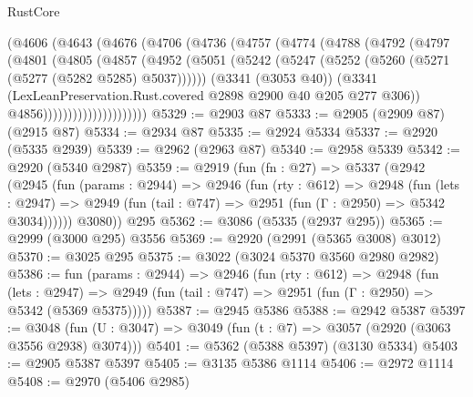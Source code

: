 \begin{lexlean}{RustCore}
\begin{coremodule}
                (@4606
                  (@4643
                    (@4676
                      (@4706
                        (@4736
                          (@4757
                            (@4774
                              (@4788
                                (@4792
                                  (@4797
                                    (@4801
                                      (@4805
                                        (@4857
                                          (@4952
                                            (@5051
                                              (@5242
                                                (@5247
                                                  (@5252
                                                    (@5260 (@5271 (@5277 (@5282 @5285) @5037))))))
                                              (@3341 (@3053 @40))
                                              (@3341
                                                (LexLeanPreservation.Rust.covered
                                                  @2898
                                                  @2900
                                                  @40
                                                  @205
                                                  @277
                                                  @306))
                                              @4856)))))))))))))))))))))
@5329 := @2903 @87
@5333 := @2905 (@2909 @87) (@2915 @87)
@5334 := @2934 @87
@5335 := @2924 @5334
@5337 := @2920 (@5335 @2939)
@5339 := @2962 (@2963 @87)
@5340 := @2958 @5339
@5342 := @2920 (@5340 @2987)
@5359 := @2919
    (fun (fn : @27) =>
    @5337
      (@2942
        (@2945
          (fun (params : @2944) =>
          @2946
            (fun (rty : @612) =>
            @2948
              (fun (lets : @2947) =>
              @2949 (fun (tail : @747) => @2951 (fun (Γ : @2950) => @5342 @3034))))))
        @3080))
    @295
@5362 := @3086 (@5335 (@2937 @295))
@5365 := @2999 (@3000 @295) @3556
@5369 := @2920 (@2991 (@5365 @3008) @3012)
@5370 := @3025 @295
@5375 := @3022 (@3024 @5370 @3560 @2980 @2982)
@5386 := fun (params : @2944) =>
  @2946
    (fun (rty : @612) =>
    @2948
      (fun (lets : @2947) =>
      @2949 (fun (tail : @747) => @2951 (fun (Γ : @2950) => @5342 (@5369 @5375)))))
@5387 := @2945 @5386
@5388 := @2942 @5387
@5397 := @3048 (fun (U : @3047) => @3049 (fun (t : @7) => @3057 (@2920 (@3063 @3556 @2938) @3074)))
@5401 := @5362 (@5388 @5397) (@3130 @5334)
@5403 := @2905 @5387 @5397
@5405 := @3135 @5386 @1114
@5406 := @2972 @1114
@5408 := @2970 (@5406 @2985)

\end{coremodule}
\end{lexlean}
